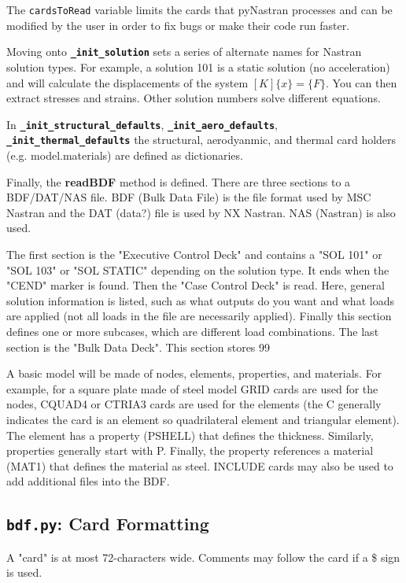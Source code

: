      The {\tt cardsToRead} variable limits the cards that pyNastran processes and     can be modified by the user in order to fix bugs or make their code run faster.
     
     Moving onto {\bf \tt \_init\_solution} sets a series of alternate names for Nastran solution types.  For example, a solution 101 is a static solution (no acceleration) and will calculate the displacements of the system $[K]\{x\} = \{F\} $.  You can then extract stresses and strains.  Other solution numbers solve different equations.
     
     In {\bf \tt \_init\_structural\_defaults}, {\bf \tt \_init\_aero\_defaults}, {\bf \tt \_init\_thermal\_defaults} the structural, aerodyanmic, and thermal card holders (e.g. model.materials) are defined as dictionaries.

     Finally, the {\bf readBDF} method is defined.  There are three sections to a BDF/DAT/NAS file.  BDF (Bulk Data File) is the file format used by MSC Nastran and the DAT (data?) file is used by NX Nastran.  NAS (Nastran) is also used.

     The first section is the "Executive Control Deck" and contains a "SOL 101" or "SOL 103" or "SOL STATIC" depending on the solution type.  It ends when the "CEND" marker is found. Then the "Case Control Deck" is read.  Here, general solution information is listed, such  as what outputs do you want and what loads are applied (not all loads in the file are necessarily applied).  Finally this section defines one or more subcases, which are different load combinations.  The last section is the "Bulk Data Deck".  This section stores 99%
     
     A basic model will be made of nodes, elements, properties, and materials.  For example, for a square plate made of steel model GRID cards are used for the nodes, CQUAD4 or CTRIA3 cards are used for the elements (the C generally indicates the card is an element so quadrilateral element and triangular element).  The element has a property (PSHELL) that defines the thickness.  Similarly, properties generally start with P.  Finally,  the property references a material (MAT1) that defines the material as steel.  INCLUDE cards may also be used to add additional files into the BDF.
     
 \subsection{{\tt bdf.py}: Card Formatting}
     A "card" is at most 72-characters wide.  Comments may follow the card if a \$ sign is used.
     
